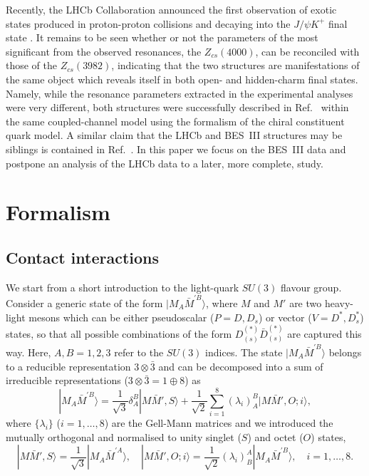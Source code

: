 \documentclass[preprint,12pt,3p]{elsarticle}
\newcommand{\be}{\begin{equation}}
\newcommand{\ee}{\end{equation}}
\begin{document}
Recently, the LHCb Collaboration announced the first observation of exotic states produced in proton-proton collisions and decaying into the
$J/\psi K^+$ final state \cite{LHCb:2021uow}. It remains to be seen whether or not the parameters of the most significant from the observed resonances, the $Z_{cs}(4000)$, can be reconciled with those of the $Z_{cs}(3982)$, indicating that the two structures are manifestations of the same object which reveals itself in both open- and hidden-charm final states. Namely, while the resonance parameters extracted in the experimental analyses were very different, both structures were successfully described in Ref.~\cite{Ortega:2021enc} within the same coupled-channel model using the formalism of the chiral constituent quark model. A similar claim that the LHCb and BES~III structures may be siblings is contained in Ref.~\cite{Yang:2020nrt}. In this paper we focus on the BES~III data and postpone an analysis of the LHCb data to a later, more complete, study.

\section{Formalism}

\subsection{Contact interactions}
\label{Sec:CT}

We start from a short introduction to the light-quark $SU(3)$ flavour group. Consider a generic state of the form $|M_A\bar{M}^{\prime B}\rangle$, where 
$M$ and $M'$ are two heavy-light mesons which can be either pseudoscalar ($P=D,D_s$) or vector ($V=D^*,D_s^*$)
states, so that all possible combinations of the form
$D^{(*)}_{(s)}\bar{D}^{(*)}_{(s)}$ are captured this way. Here,
$A,B=1,2,3$ refer to the $SU(3)$ indices. The state
$|M_A\bar{M}^{\prime B}\rangle$ belongs to a reducible representation $3\otimes\bar{3}$ and can be decomposed into a sum of irreducible representations ($3\otimes\bar{3}=1\oplus 8$) as
\be
|M_A\bar{M}^{\prime B}\rangle=\frac{1}{\sqrt{3}}\delta_A^B|M\bar{M}',S\rangle+\frac{1}{\sqrt{2}}\sum_{i=1}^8\left(\lambda_i\right)_A^B|M\bar{M}',O;i\rangle,
\ee
where $\{\lambda_i\}$ ($i=1,\ldots,8$) are the Gell-Mann matrices and we
introduced the mutually orthogonal and normalised to unity singlet ($S$) and octet ($O$) states,
\be
|M\bar{M}',S\rangle=\frac{1}{\sqrt{3}}|M_A\bar{M}^{\prime A}\rangle,\quad
|M\bar{M}',O;i\rangle=\frac{1}{\sqrt{2}}\left(\lambda_i\right)_B^A|M_A\bar{M}^{\prime B}\rangle,
\quad i=1,\ldots,8.
\ee
\end{document}
